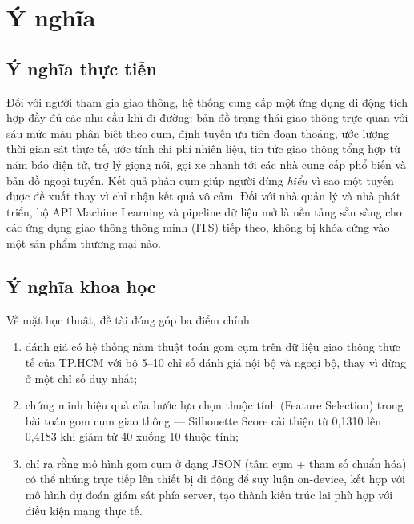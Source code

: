 \section{Ý nghĩa}

\subsection{Ý nghĩa thực tiễn}
Đối với người tham gia giao thông, hệ thống cung cấp một ứng dụng di động tích hợp đầy đủ các nhu cầu khi đi đường: bản đồ trạng thái giao thông trực quan với sáu mức màu phân biệt theo cụm, định tuyến ưu tiên đoạn thoáng, ước lượng thời gian sát thực tế, ước tính chi phí nhiên liệu, tin tức giao thông tổng hợp từ năm báo điện tử, trợ lý giọng nói, gọi xe nhanh tới các nhà cung cấp phổ biến và bản đồ ngoại tuyến. Kết quả phân cụm giúp người dùng \textit{hiểu} vì sao một tuyến được đề xuất thay vì chỉ nhận kết quả vô cảm. Đối với nhà quản lý và nhà phát triển, bộ API Machine Learning và pipeline dữ liệu mở là nền tảng sẵn sàng cho các ứng dụng giao thông thông minh (ITS) tiếp theo, không bị khóa cứng vào một sản phẩm thương mại nào.

\subsection{Ý nghĩa khoa học}
Về mặt học thuật, đề tài đóng góp ba điểm chính:
\begin{enumerate}[label=(\roman*),leftmargin=2.2cm,itemsep=2pt]
 \item đánh giá có hệ thống năm thuật toán gom cụm trên dữ liệu giao thông thực tế của TP.HCM với bộ 5--10 chỉ số đánh giá nội bộ và ngoại bộ, thay vì dừng ở một chỉ số duy nhất;
 \item chứng minh hiệu quả của bước lựa chọn thuộc tính (Feature Selection) trong bài toán gom cụm giao thông --- Silhouette Score cải thiện từ 0{,}1310 lên 0{,}4183 khi giảm từ 40 xuống 10 thuộc tính;
 \item chỉ ra rằng mô hình gom cụm ở dạng JSON (tâm cụm + tham số chuẩn hóa) có thể nhúng trực tiếp lên thiết bị di động để suy luận on-device, kết hợp với mô hình dự đoán giám sát phía server, tạo thành kiến trúc lai phù hợp với điều kiện mạng thực tế.
\end{enumerate}

